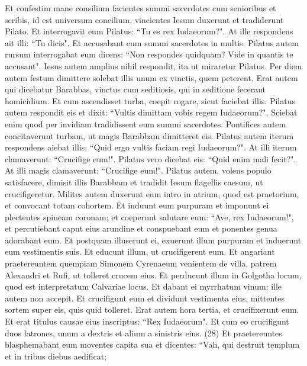 \begin{biblechapter}  
\verse Et confestim mane consilium facientes summi sacerdotes cum senioribus et scribis, id est universum concilium, vincientes Iesum duxerunt et tradiderunt Pilato. 
\verse Et interrogavit eum Pilatus: “Tu es rex Iudaeorum?". At ille respondens ait illi: “Tu dicis". 
\verse Et accusabant eum summi sacerdotes in multis. 
\verse Pilatus autem rursum interrogabat eum dicens: “Non respondes quidquam? Vide in quantis te accusant". 
\verse Iesus autem amplius nihil respondit, ita ut miraretur Pilatus. 
\verse Per diem autem festum dimittere solebat illis unum ex vinctis, quem peterent. 
\verse Erat autem qui dicebatur Barabbas, vinctus cum seditiosis, qui in seditione fecerant homicidium. 
\verse Et cum ascendisset turba, coepit rogare, sicut faciebat illis. 
\verse Pilatus autem respondit eis et dixit: “Vultis dimittam vobis regem Iudaeorum?". 
\verse Sciebat enim quod per invidiam tradidissent eum summi sacerdotes. 
\verse Pontifices autem concitaverunt turbam, ut magis Barabbam dimitteret eis. 
\verse Pilatus autem iterum respondens aiebat illis: “Quid ergo vultis faciam regi Iudaeorum?". 
\verse At illi iterum clamaverunt: “Crucifige eum!". 
\verse Pilatus vero dicebat eis: “Quid enim mali fecit?". At illi magis clamaverunt: “Crucifige eum!". 
\verse Pilatus autem, volens populo satisfacere, dimisit illis Barabbam et tradidit Iesum flagellis caesum, ut crucifigeretur. 
\verse Milites autem duxerunt eum intro in atrium, quod est praetorium, et convocant totam cohortem. 
\verse Et induunt eum purpuram et imponunt ei plectentes spineam coronam; 
\verse et coeperunt salutare eum: “Ave, rex Iudaeorum!", 
\verse et percutiebant caput eius arundine et conspuebant eum et ponentes genua adorabant eum. 
\verse Et postquam illuserunt ei, exuerunt illum purpuram et induerunt eum vestimentis suis. Et educunt illum, ut crucifigerent eum. 
\verse Et angariant praetereuntem quempiam Simonem Cyrenaeum venientem de villa, patrem Alexandri et Rufi, ut tolleret crucem eius. 
\verse Et perducunt illum in Golgotha locum, quod est interpretatum Calvariae locus. 
\verse Et dabant ei myrrhatum vinum; ille autem non accepit. 
\verse Et crucifigunt eum et dividunt vestimenta eius, mittentes sortem super eis, quis quid tolleret. 
\verse Erat autem hora tertia, et crucifixerunt eum. 
\verse Et erat titulus causae eius inscriptus: “Rex Iudaeorum". 
\verse Et cum eo crucifigunt duos latrones, unum a dextris et alium a sinistris eius. (28) 
\verse Et praetereuntes blasphemabant eum moventes capita sua et dicentes: “Vah, qui destruit templum et in tribus diebus aedificat;  

\end{biblechapter}
